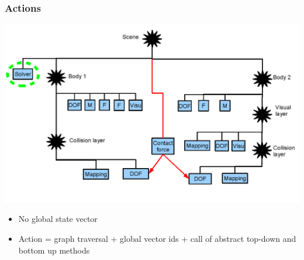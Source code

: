 \documentclass[a4paper,compress]{beamer}
\begin{document}
\begin{frame} 
\frametitle{Actions}
\begin{center}
 \includegraphics[width=0.7\linewidth]{livers-contact-tree-common.png}
\end{center}


\begin{itemize}
\item No global state vector
 \item Action = graph traversal + global vector ids + call of abstract top-down and bottom up methods 

\end{itemize}

\end{frame}


\end{document}
